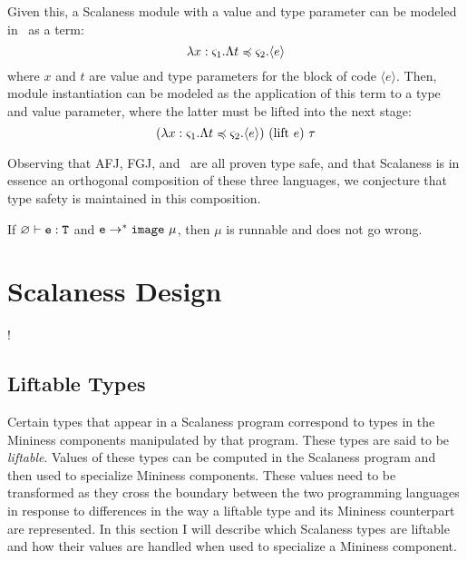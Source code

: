 Given this, a Scalaness module with a value and type parameter can be
modeled in \fml\ as a term: 
$$\lambda x : \s_1 . \Lambda t \subtype \s_2 . \langle e \rangle$$
where $x$ and $t$ are value and type parameters for the block of code
$\langle e \rangle$.  Then, module instantiation can be modeled as the
application of this term to a type and value parameter, where the
latter must be lifted into the next stage:
$$
(\lambda x : \s_1 . \Lambda t \subtype \s_2 . \langle e \rangle)\ (\mathrm{lift}\ e)\ \t
$$ 

Observing that AFJ, FGJ, and \fml\ are all proven type safe, and that
Scalaness is in essence an orthogonal composition of these three
languages, we conjecture that type safety is maintained in this
composition. 

\begin{conject}
If $\varnothing \vdash \tt{e} : \tt{T}$ and $\tt{e} \rightarrow^*
\jimage{\mu}$, then $\mu$ is runnable and does not go wrong.
\end{conject}


\section{Scalaness Design}
\label{section-scalaness-design}

\lstset{language=scalaness}
\lstMakeShortInline!

\subsection{Liftable Types}
\label{section-liftable-types-design}

Certain types that appear in a Scalaness program correspond to types in the Mininess components
manipulated by that program. These types are said to be \textit{liftable}. Values of these types
can be computed in the Scalaness program and then used to specialize Mininess components. These
values need to be transformed as they cross the boundary between the two programming languages
in response to differences in the way a liftable type and its Mininess counterpart are
represented. In this section I will describe which Scalaness types are liftable and how their
values are handled when used to specialize a Mininess component.

